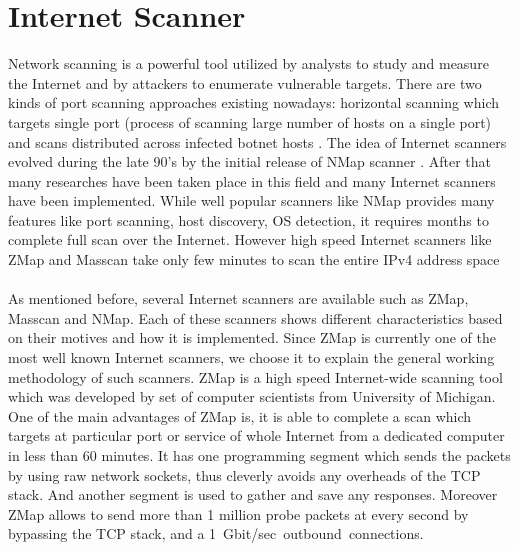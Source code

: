 	\section{Internet Scanner}
	Network scanning is a powerful tool utilized by analysts to study and measure the Internet and by attackers to enumerate vulnerable targets.
	There are two kinds of port scanning approaches existing nowadays: horizontal scanning which targets single port (process of scanning large number of hosts on a single port) and scans distributed across infected botnet hosts \cite{allman2007brief}\cite{dainotti2012analysis}\cite{czyz2013understanding}\cite{pang2004characteristics}.
	The idea of Internet scanners evolved during the late 90's by the initial release of NMap scanner \cite{lyon2009nmap}.
	After that many researches have been taken place in this field and many Internet scanners have been implemented.
	While well popular scanners like NMap provides many features like port scanning, host discovery, OS detection, it requires months to complete full scan over the Internet.
	However high speed Internet scanners like ZMap \cite{durumeric2013zmap} and Masscan \cite{graham2014masscan} take only few minutes to scan the entire IPv4 address space\\\\	
	As mentioned before, several Internet scanners are available such as ZMap, Masscan and NMap.
	Each of these scanners shows different characteristics based on their motives and how it is implemented.
	Since ZMap is currently one of the most well known Internet scanners, we choose it to explain the general working methodology of such scanners.
	ZMap \cite{durumeric2013zmap} is a high speed Internet-wide scanning tool which was developed by set of computer scientists from University of Michigan.
	One of the main advantages of ZMap is, it is able to complete a scan which targets at particular port or service of whole Internet from a dedicated computer in less than 60 minutes.
	It has one programming segment which sends the packets by using raw network sockets, thus cleverly avoids any overheads of the TCP stack.
	And another segment is used to gather and save any responses.
	Moreover ZMap allows to send more than 1 million probe packets at every second by bypassing the TCP stack, and a \SI{1}Gbit/sec outbound connections.
